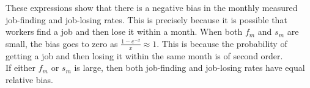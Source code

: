 These expressions show that there is a negative bias in the monthly measured job-finding and job-losing rates. This is precisely because it is possible that workers find a job and then lose it within a month. When both $f_m$ and $s_m$ are small, the bias goes to zero as $\frac{1-e^{-x}}{x} \approx 1$. This is because the probability of getting a job and then losing it within the same month is of second order.\\

If either $f_m$ or $s_m$ is large, then both job-finding and job-losing rates have equal relative bias. 

